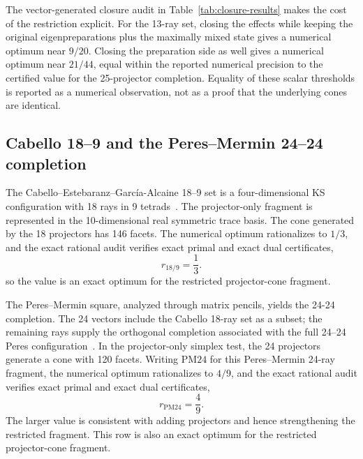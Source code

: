 \documentclass[aps,pra,twocolumn,superscriptaddress,nofootinbib]{revtex4-2}
\begin{document}
The vector-generated closure audit in Table~\ref{tab:closure-results} makes the cost of the restriction explicit.  For the 13-ray set, closing the effects while keeping the original eigenpreparations plus the maximally mixed state gives a numerical optimum near \(9/20\).  Closing the preparation side as well gives a numerical optimum near \(21/44\), equal within the reported numerical precision to the certified value for the 25-projector completion.  Equality of these scalar thresholds is reported as a numerical observation, not as a proof that the underlying cones are identical.

\subsection{Cabello 18--9 and the Peres--Mermin 24--24 completion}

The Cabello--Estebaranz--Garc\'ia-Alcaine 18--9 set is a four-dimensional KS configuration with 18 rays in 9 tetrads~\cite{cabello-96}.  The projector-only fragment is represented in the 10-dimensional real symmetric trace basis.  The cone generated by the 18 projectors has 146 facets.  The numerical optimum rationalizes to $1/3$, and the exact rational audit verifies exact primal and exact dual certificates,
\begin{equation}
        r_{18/9}=\frac13.
        \label{eq:cabello-result}
\end{equation}
so the value is an exact optimum for the restricted projector-cone fragment.

The Peres--Mermin square, analyzed through matrix pencils, yields the 24-24 completion.  The 24 vectors include the Cabello 18-ray set as a subset; the remaining rays supply the orthogonal completion associated with the full 24--24 Peres configuration~\cite{svozil-2024-convert-pra-externalfigures}.  In the projector-only simplex test, the 24 projectors generate a cone with 120 facets.  Writing \(\mathrm{PM24}\) for this Peres--Mermin 24-ray fragment, the numerical optimum rationalizes to $4/9$, and the exact rational audit verifies exact primal and exact dual certificates,
\begin{equation}
        r_{\mathrm{PM24}}=\frac49.
        \label{eq:pm24-result}
\end{equation}
The larger value is consistent with adding projectors and hence strengthening the restricted fragment.  This row is also an exact optimum for the restricted projector-cone fragment.
\end{document}
